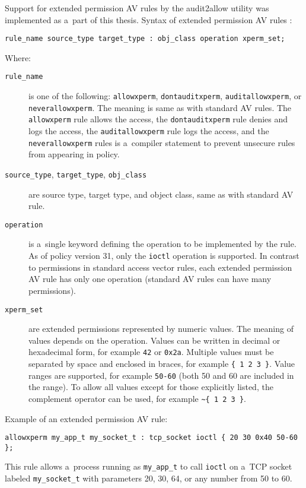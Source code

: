 Support for extended permission AV rules by the audit2allow utility was
implemented as a~part of this thesis. Syntax of extended permission AV rules
\cite{xpermrules}:
\begin{lstlisting}[language=te]
rule_name source_type target_type : obj_class operation xperm_set;
\end{lstlisting}
Where:
\begin{description}
    \item [\texttt{rule\_name}] is one of the following: \texttt{allowxperm},
        \texttt{dontauditxperm}, \texttt{auditallowxperm}, or
        \texttt{neverallowxperm}. The meaning is same as with standard AV rules.
        The \texttt{allowxperm} rule allows the access, the
        \texttt{dontauditxperm} rule denies and logs the access, the
        \texttt{auditallowxperm} rule logs the access, and the
        \texttt{neverallowxperm} rules is a~compiler statement to prevent
        unsecure rules from appearing in policy.
    \item [\texttt{source\_type}, \texttt{target\_type}, \texttt{obj\_class}]
        are source type, target type, and object class, same as with standard AV
        rule.
    \item [\texttt{operation}] is a~single keyword defining the operation to be
        implemented by the rule. As of policy version 31, only the
        \texttt{ioctl} operation is supported. In contrast to permissions in
        standard access vector rules, each extended permission AV rule has only
        one operation (standard AV rules can have many permissions).
    \item [\texttt{xperm\_set}] are extended permissions represented by numeric
        values. The meaning of values depends on the operation. Values can be
        written in decimal or hexadecimal form, for example \texttt{42} or
        \texttt{0x2a}. Multiple values must be separated by space and enclosed
        in braces, for example \texttt{\{ 1 2 3 \}}. Value ranges are supported,
        for example \texttt{50-60} (both 50 and 60 are included in the range).
        To allow all values except for those explicitly listed, the complement
        operator can be used, for example \texttt{\textasciitilde \{ 1 2 3 \}}.
\end{description}

Example of an extended permission AV rule:
\begin{lstlisting}[language=te]
allowxperm my_app_t my_socket_t : tcp_socket ioctl { 20 30 0x40 50-60 };
\end{lstlisting}
This rule allows a~process running as \texttt{my\_app\_t} to call \texttt{ioctl}
on a~TCP socket labeled \texttt{my\_socket\_t} with parameters 20, 30, 64, or
any number from 50 to 60.

